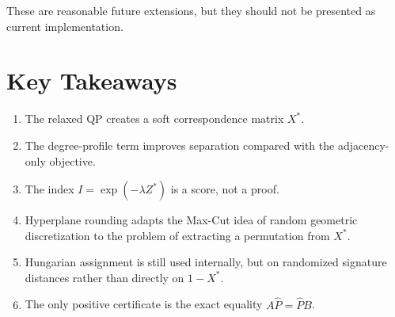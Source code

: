 \documentclass[11pt]{article}
\begin{document}
These are reasonable future extensions, but they should not be presented as
current implementation.

\section{Key Takeaways}

\begin{enumerate}[leftmargin=*]
    \item The relaxed QP creates a soft correspondence matrix $X^*$.
    \item The degree-profile term improves separation compared with the
    adjacency-only objective.
    \item The index $I=\exp(-\lambda Z^*)$ is a score, not a proof.
    \item Hyperplane rounding adapts the Max-Cut idea of random geometric
    discretization to the problem of extracting a permutation from $X^*$.
    \item Hungarian assignment is still used internally, but on randomized
    signature distances rather than directly on $1-X^*$.
    \item The only positive certificate is the exact equality
    $A\hat P=\hat P B$.
\end{enumerate}
\end{document}
